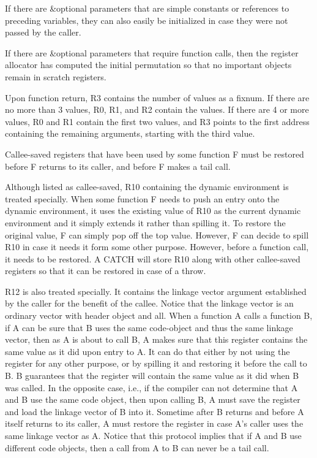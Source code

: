 If there are \&optional parameters that are simple constants or
references to preceding variables, they can also easily be
initialized in case they were not passed by the caller. 

If there are \&optional parameters that require function calls, then
the register allocator has computed the initial permutation so that no
important objects remain in scratch registers.  

Upon function return, R3 contains the number of values as a fixnum.
If there are no more than 3 values, R0, R1, and R2 contain the
values. If there are 4 or more values, R0 and R1 contain the first two
values, and R3 points to the first address containing the remaining
arguments, starting with the third value.

Callee-saved registers that have been used by some function F must be
restored before F returns to its caller, and before F makes a tail
call.

Although listed as callee-saved, R10 containing the dynamic
environment is treated specially.  When some function F needs to push
an entry onto the dynamic environment, it uses the existing value of
R10 as the current dynamic environment and it simply extends it rather
than spilling it.  To restore the original value, F can simply pop off
the top value.  However, F can decide to spill R10 in case it needs it
form some other purpose.  However, before a function call, it needs to
be restored.  A CATCH will store R10 along with other callee-saved
registers so that it can be restored in case of a throw.

R12 is also treated specially.  It contains the linkage vector
argument established by the caller for the benefit of the callee.
Notice that the linkage vector is an ordinary \cl{} vector with header
object and all.  When a function A calls a function B, if A can be
sure that B uses the same code-object and thus the same linkage
vector, then as A is about to call B, A makes sure that this register
contains the same value as it did upon entry to A.  It can do that
either by not using the register for any other purpose, or by spilling
it and restoring it before the call to B.  B guarantees that the
register will contain the same value as it did when B was called.  In
the opposite case, i.e., if the compiler can not determine that A and
B use the same code object, then upon calling B, A must save the
register and load the linkage vector of B into it.  Sometime after B
returns and before A itself returns to its caller, A must restore the
register in case A's caller uses the same linkage vector as A.  Notice
that this protocol implies that if A and B use different code objects,
then a call from A to B can never be a tail call.

